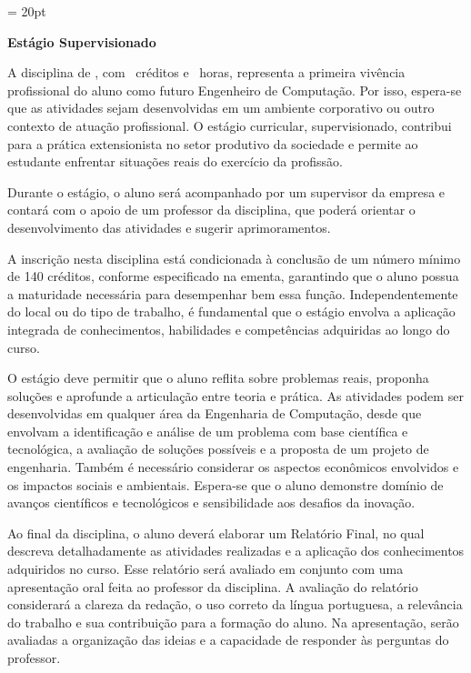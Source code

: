 \documentclass[12pt,a4paper]{article}
\begin{document}
\thispagestyle{firstpage} %
\headsep = 20pt
\setlength{\tabcolsep}{5pt} %
\vspace*{2.0cm}

\pagestyle{plain} %

\begin{center}
  \textbf{\LARGE Estágio Supervisionado}
\end{center}
\vspace*{0.5cm}

A disciplina de \textbf{\EstSup}, com \EstSupCred~créditos e \EstSupCH~horas, representa a primeira vivência profissional do aluno como futuro Engenheiro de Computação. Por isso, espera-se que as atividades sejam desenvolvidas em um ambiente corporativo ou outro contexto de atuação profissional. O estágio curricular, supervisionado, contribui para a prática extensionista no setor produtivo da sociedade e permite ao estudante enfrentar situações reais do exercício da profissão.

Durante o estágio, o aluno será acompanhado por um supervisor da empresa e contará com o apoio de um professor da disciplina, que poderá orientar o desenvolvimento das atividades e sugerir aprimoramentos.

A inscrição nesta disciplina está condicionada à conclusão de um número mínimo de 140 créditos, conforme especificado na ementa, garantindo que o aluno possua a maturidade necessária para desempenhar bem essa função. Independentemente do local ou do tipo de trabalho, é fundamental que o estágio envolva a aplicação integrada de conhecimentos, habilidades e competências adquiridas ao longo do curso.

O estágio deve permitir que o aluno reflita sobre problemas reais, proponha soluções e aprofunde a articulação entre teoria e prática. As atividades podem ser desenvolvidas em qualquer área da Engenharia de Computação, desde que envolvam a identificação e análise de um problema com base científica e tecnológica, a avaliação de soluções possíveis e a proposta de um projeto de engenharia. Também é necessário considerar os aspectos econômicos envolvidos e os impactos sociais e ambientais. Espera-se que o aluno demonstre domínio de avanços científicos e tecnológicos e sensibilidade aos desafios da inovação.

Ao final da disciplina, o aluno deverá elaborar um Relatório Final, no qual descreva detalhadamente as atividades realizadas e a aplicação dos conhecimentos adquiridos no curso. Esse relatório será avaliado em conjunto com uma apresentação oral feita ao professor da disciplina. A avaliação do relatório considerará a clareza da redação, o uso correto da língua portuguesa, a relevância do trabalho e sua contribuição para a formação do aluno. Na apresentação, serão avaliadas a organização das ideias e a capacidade de responder às perguntas do professor.
\end{document}
